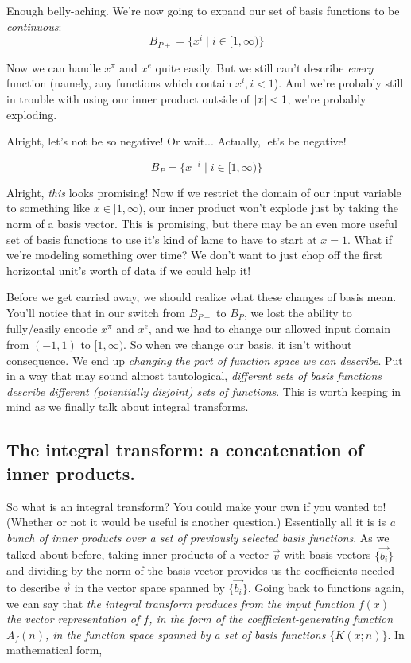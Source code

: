 \documentclass[letterpaper,12pt]{report}
\begin{document}
Enough belly-aching. We're now going to expand our
set of basis functions to be \emph{continuous}:
\[B_{P+} = \{x^i \mid i \in [1, \infty)\} \] 

Now we can handle \(x^\pi\) and \(x^e\) quite easily.
But we still can't describe \emph{every} function (namely,
any functions which contain \(x^i, i < 1\)).
And we're probably still in trouble with using our
inner product \textemdash{} outside of \(\abs{x} < 1\),
we're probably exploding.\par

Alright, let's not be so negative! Or wait... 
Actually, let's be negative!

\[B_{P} = \{x^{-i} \mid i \in [1, \infty)\} \] 

Alright, \emph{this} looks promising! Now if we restrict
the domain of our input variable to 
something like \(x \in [1, \infty)\),
our inner product
won't explode just by taking the norm of a basis vector.
This is promising, but there may be an even more useful
set of basis functions to use \textemdash{} it's kind of
lame to have to start at \(x=1\). What if we're modeling
something over time? We don't want to just chop
off the first horizontal unit's worth of data if we 
could help it! \par

Before we get carried away, we should realize what these
changes of basis mean. You'll notice that in our switch
from \(B_{P+}\) to \(B_{P}\), we lost the ability to
fully/easily encode \(x^\pi\) and \(x^e\), and we
had to change our allowed input domain from \((-1,1)\)
to \([1, \infty)\). So when we change our basis, it
isn't without consequence. We end up
\emph{changing the part of function space we can describe}. 
Put in a way that may sound almost tautological,
\emph{different sets of basis functions
describe different (potentially disjoint) sets of functions}.
This is worth keeping in mind as we finally talk about
integral transforms.


\subsection{The integral transform: a concatenation of inner products.}

So what is an integral transform?
You could make your own if you wanted to!
(Whether or not it would be useful is another question.)
Essentially all it is is \emph{a bunch of inner products
over a set of previously selected basis functions}.
As we talked about before, taking inner products of
a vector \(\vec{v}\)
with basis vectors \(\{\vec{b_i}\}\)
and dividing by the norm of the basis vector
provides us the coefficients needed to describe \(\vec{v}\)
in the vector space spanned by \(\{\vec{b_i}\}\).
Going back to functions again, 
we can say that \emph{the integral transform
produces from the input function \(f(x)\)
the vector representation of \(f\),
in the form of the coefficient-generating function \(A_f(n)\),
in the function space spanned by a set of basis functions
\(\{K(x;n)\}\)}. In mathematical form,
\end{document}
